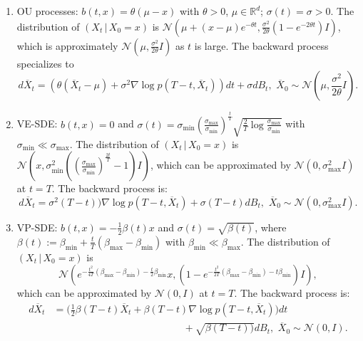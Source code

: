 \documentclass[letterpaper,10pt,reqno]{amsart}
\numberwithin{equation}{section}
\begin{document}
\begin{enumerate}[itemsep = 3 pt]
\item[(a)]
OU processes: $b(t,x) = \theta (\mu - x)$ with $\theta > 0$, $\mu \in \mathbb{R}^d$; 
$\sigma(t) = \sigma > 0$.
The distribution of $(X_t \,|\, X_0 = x)$ is 
$\mathcal{N}(\mu + (x - \mu) e^{-\theta t}, \frac{\sigma^2}{2\theta} (1 - e^{-2 \theta t}) I)$,
which is approximately 
$\mathcal{N}(\mu, \frac{\sigma^2}{2 \theta} I)$ as $t$ is large.
The backward process specializes to
\begin{equation}
\label{eq:OUrev2}
d\overline{X}_t = (\theta(\overline{X}_t - \mu) + \sigma^2 \nabla \log p(T-t, \overline{X}_t)) dt  + \sigma dB_t, 
\,\, \overline{X}_0 \sim \mathcal{N}\left(\mu, \frac{\sigma^2}{2 \theta} I\right).
\end{equation}
\item[(b)]
VE-SDE:
$b(t,x) = 0$ and 
$\sigma(t) = \sigma_{\min} \left(\frac{\sigma_{\max}}{\sigma_{\min}} \right)^{\frac{t}{T}} \sqrt{\frac{2}{T} \log \frac{\sigma_{\max}}{\sigma_{\min}}}$
with 
$\sigma_{\min} \ll  \sigma_{\max}$.
The distribution of $(X_t \,|\, X_0 = x)$ is $\mathcal{N}\left(x, \sigma^2_{\min}\left( \left(\frac{\sigma_{\max}}{\sigma_{\min}} \right)^{\frac{2t}{T}}- 1 \right) I \right)$, 
which can be approximated by $\mathcal{N}(0, \sigma^2_{\max} I)$ at $t = T$.
The backward process is:
\begin{equation}
\label{eq:VErev2}
d\overline{X}_t  = \sigma^2(T-t) ) \nabla \log p(T-t, \overline{X}_t)+  \sigma(T-t) dB_t, 
\,\, \overline{X}_0 \sim \mathcal{N}(0, \sigma^2_{\max} I).
\end{equation}
\item[(c)]
VP-SDE: 
$b(t,x) = -\frac{1}{2}\beta(t) x$ and $\sigma(t) = \sqrt{\beta(t)}$,
where 
$\beta(t):= \beta_{\min} + \frac{t}{T}(\beta_{\max} - \beta_{\min})$ with $\beta_{\min} \ll \beta_{\max}$.
The distribution of $(X_t \,|\, X_0 = x)$ is
$$\mathcal{N}( e^{-\frac{t^2}{4T}(\beta_{\max} - \beta_{\min}) - \frac{t}{2} \beta_{\min}}  x,  
(1 -e^{-\frac{t^2}{2T}(\beta_{\max} - \beta_{\min}) - t \beta_{\min}} ) I),$$
which can be approximated by $\mathcal{N}(0,I)$ at $t = T$.
The backward process is:
\begin{equation}
\label{eq:VPrev2}
\begin{aligned}
d\overline{X}_t & = \bigg(\frac{1}{2} \beta(T-t) \overline{X}_t + \beta(T-t) \nabla \log p(T-t, \overline{X}_t)\bigg)  dt \\
& \qquad \qquad \qquad \qquad \qquad \qquad  \quad + \sqrt{\beta(T-t))} dB_t, \,\, \overline{X}_0 \sim \mathcal{N}(0, I).

\end{aligned}
\end{equation}
\end{enumerate}
\end{document}
